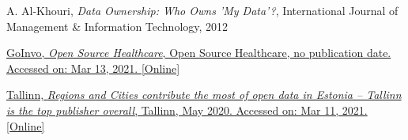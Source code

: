\documentclass[12pt]{article}
\begin{document}
\begin{thebibliography}{}
		A. Al-Khouri, \textit{Data Ownership: Who Owns 'My Data'?}, International Journal of Management \& Information Technology, 2012
		
		\href{https://opensourcehealthcare.org/}{GoInvo, \textit{Open Source Healthcare}, Open Source Healthcare, no publication date. Accessed on: Mar 13, 2021. [Online]}
		
		\href{https://www.tallinn.ee/eng/Uudis-Regions-and-Cities-contribute-the-most-of-open-data-in-Estonia-Tallinn-is-the-top-publisher-overall.}{Tallinn, \textit{Regions and Cities contribute the most of open data in Estonia – Tallinn is the top publisher overall}, Tallinn, May 2020. Accessed on: Mar 11, 2021. [Online]}
		
	\end{thebibliography}
	
	
\end{document}
